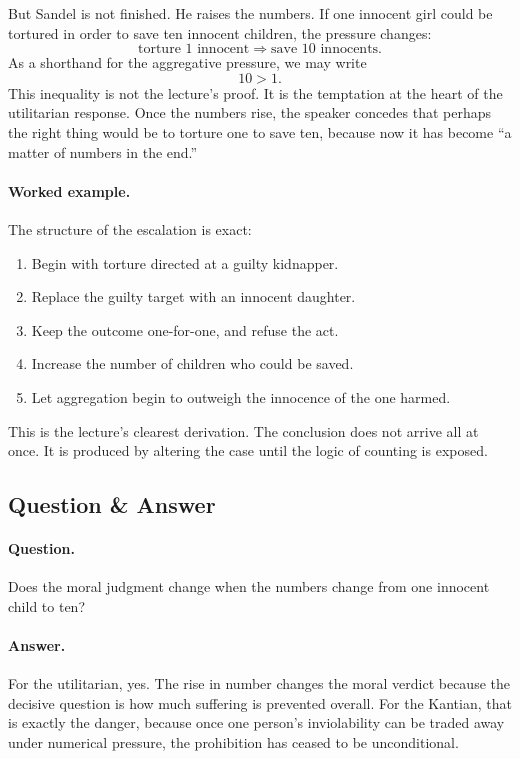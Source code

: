 But Sandel is not finished. He raises the numbers. If one innocent girl could be tortured in order to save ten innocent children, the pressure changes:
\begin{equation}
\text{torture }1\text{ innocent}
\Longrightarrow
\text{save }10\text{ innocents}.
\end{equation}
As a shorthand for the aggregative pressure, we may write
\begin{equation}
10 > 1.
\end{equation}
This inequality is not the lecture's proof. It is the temptation at the heart of the utilitarian response. Once the numbers rise, the speaker concedes that perhaps the right thing would be to torture one to save ten, because now it has become ``a matter of numbers in the end.''

\paragraph{Worked example.} The structure of the escalation is exact:
\begin{enumerate}
\item Begin with torture directed at a guilty kidnapper.
\item Replace the guilty target with an innocent daughter.
\item Keep the outcome one-for-one, and refuse the act.
\item Increase the number of children who could be saved.
\item Let aggregation begin to outweigh the innocence of the one harmed.
\end{enumerate}
This is the lecture's clearest derivation. The conclusion does not arrive all at once. It is produced by altering the case until the logic of counting is exposed.

\subsection{Question \& Answer}

\paragraph{Question.} Does the moral judgment change when the numbers change from one innocent child to ten?

\paragraph{Answer.} For the utilitarian, yes. The rise in number changes the moral verdict because the decisive question is how much suffering is prevented overall. For the Kantian, that is exactly the danger, because once one person's inviolability can be traded away under numerical pressure, the prohibition has ceased to be unconditional.

